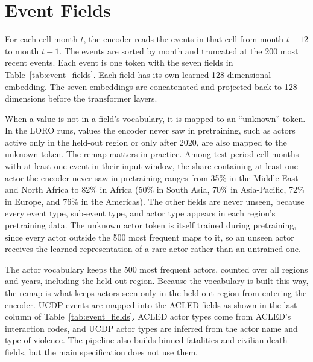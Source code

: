 \documentclass[11pt, letterpaper]{article}
\begin{document}
\section{Event Fields}
\label{app:fields}
For each cell-month $t$, the encoder reads the events in that cell from month $t-12$ to month $t-1$. The events are sorted by month and truncated at the 200 most recent events. Each event is one token with the seven fields in Table~\ref{tab:event_fields}. Each field has its own learned 128-dimensional embedding. The seven embeddings are concatenated and projected back to 128 dimensions before the transformer layers.

When a value is not in a field's vocabulary, it is mapped to an ``unknown'' token. In the LORO runs, values the encoder never saw in pretraining, such as actors active only in the held-out region or only after 2020, are also mapped to the unknown token. The remap matters in practice. Among test-period cell-months with at least one event in their input window, the share containing at least one actor the encoder never saw in pretraining ranges from 35\% in the Middle East and North Africa to 82\% in Africa (50\% in South Asia, 70\% in Asia-Pacific, 72\% in Europe, and 76\% in the Americas). The other fields are never unseen, because every event type, sub-event type, and actor type appears in each region's pretraining data. The unknown actor token is itself trained during pretraining, since every actor outside the 500 most frequent maps to it, so an unseen actor receives the learned representation of a rare actor rather than an untrained one.

The actor vocabulary keeps the 500 most frequent actors, counted over all regions and years, including the held-out region. Because the vocabulary is built this way, the remap is what keeps actors seen only in the held-out region from entering the encoder. UCDP events are mapped into the ACLED fields as shown in the last column of Table~\ref{tab:event_fields}. ACLED actor types come from ACLED's interaction codes, and UCDP actor types are inferred from the actor name and type of violence. The pipeline also builds binned fatalities and civilian-death fields, but the main specification does not use them.
\end{document}
